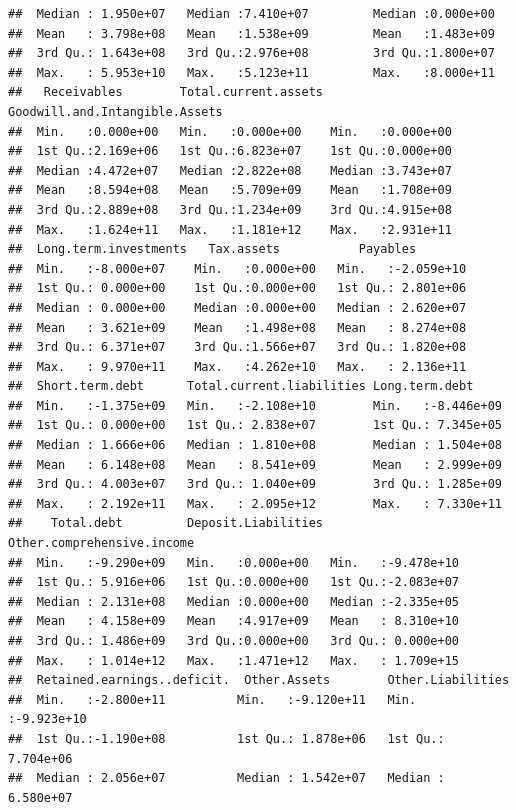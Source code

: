 \documentclass[11pt,]{article}
\begin{document}
\begin{verbatim}
##  Median : 1.950e+07   Median :7.410e+07         Median :0.000e+00     
##  Mean   : 3.798e+08   Mean   :1.538e+09         Mean   :1.483e+09     
##  3rd Qu.: 1.643e+08   3rd Qu.:2.976e+08         3rd Qu.:1.800e+07     
##  Max.   : 5.953e+10   Max.   :5.123e+11         Max.   :8.000e+11     
##   Receivables        Total.current.assets Goodwill.and.Intangible.Assets
##  Min.   :0.000e+00   Min.   :0.000e+00    Min.   :0.000e+00             
##  1st Qu.:2.169e+06   1st Qu.:6.823e+07    1st Qu.:0.000e+00             
##  Median :4.472e+07   Median :2.822e+08    Median :3.743e+07             
##  Mean   :8.594e+08   Mean   :5.709e+09    Mean   :1.708e+09             
##  3rd Qu.:2.889e+08   3rd Qu.:1.234e+09    3rd Qu.:4.915e+08             
##  Max.   :1.624e+11   Max.   :1.181e+12    Max.   :2.931e+11             
##  Long.term.investments   Tax.assets           Payables         
##  Min.   :-8.000e+07    Min.   :0.000e+00   Min.   :-2.059e+10  
##  1st Qu.: 0.000e+00    1st Qu.:0.000e+00   1st Qu.: 2.801e+06  
##  Median : 0.000e+00    Median :0.000e+00   Median : 2.620e+07  
##  Mean   : 3.621e+09    Mean   :1.498e+08   Mean   : 8.274e+08  
##  3rd Qu.: 6.371e+07    3rd Qu.:1.566e+07   3rd Qu.: 1.820e+08  
##  Max.   : 9.970e+11    Max.   :4.262e+10   Max.   : 2.136e+11  
##  Short.term.debt      Total.current.liabilities Long.term.debt      
##  Min.   :-1.375e+09   Min.   :-2.108e+10        Min.   :-8.446e+09  
##  1st Qu.: 0.000e+00   1st Qu.: 2.838e+07        1st Qu.: 7.345e+05  
##  Median : 1.666e+06   Median : 1.810e+08        Median : 1.504e+08  
##  Mean   : 6.148e+08   Mean   : 8.541e+09        Mean   : 2.999e+09  
##  3rd Qu.: 4.003e+07   3rd Qu.: 1.040e+09        3rd Qu.: 1.285e+09  
##  Max.   : 2.192e+11   Max.   : 2.095e+12        Max.   : 7.330e+11  
##    Total.debt         Deposit.Liabilities Other.comprehensive.income
##  Min.   :-9.290e+09   Min.   :0.000e+00   Min.   :-9.478e+10        
##  1st Qu.: 5.916e+06   1st Qu.:0.000e+00   1st Qu.:-2.083e+07        
##  Median : 2.131e+08   Median :0.000e+00   Median :-2.335e+05        
##  Mean   : 4.158e+09   Mean   :4.917e+09   Mean   : 8.310e+10        
##  3rd Qu.: 1.486e+09   3rd Qu.:0.000e+00   3rd Qu.: 0.000e+00        
##  Max.   : 1.014e+12   Max.   :1.471e+12   Max.   : 1.709e+15        
##  Retained.earnings..deficit.  Other.Assets        Other.Liabilities   
##  Min.   :-2.800e+11          Min.   :-9.120e+11   Min.   :-9.923e+10  
##  1st Qu.:-1.190e+08          1st Qu.: 1.878e+06   1st Qu.: 7.704e+06  
##  Median : 2.056e+07          Median : 1.542e+07   Median : 6.580e+07  

\end{verbatim}
\end{document}
